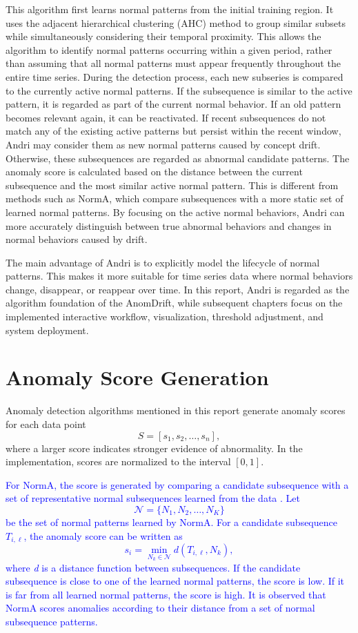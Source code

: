 This algorithm first learns normal patterns from the initial training region. It uses the adjacent hierarchical clustering (AHC) method to group similar subsets while simultaneously considering their temporal proximity. This allows the algorithm to identify normal patterns occurring within a given period, rather than assuming that all normal patterns must appear frequently throughout the entire time series. During the detection process, each new subseries is compared to the currently active normal patterns. If the subsequence is similar to the active pattern, it is regarded as part of the current normal behavior. If an old pattern becomes relevant again, it can be reactivated. If recent subsequences do not match any of the existing active patterns but persist within the recent window, Andri may consider them as new normal patterns caused by concept drift. Otherwise, these subsequences are regarded as abnormal candidate patterns. The anomaly score is calculated based on the distance between the current subsequence and the most similar active normal pattern. This is different from methods such as NormA, which compare subsequences with a more static set of learned normal patterns. By focusing on the active normal behaviors, Andri can more accurately distinguish between true abnormal behaviors and changes in normal behaviors caused by drift.

The main advantage of Andri is to explicitly model the lifecycle of normal patterns. This makes it more suitable for time series data where normal behaviors change, disappear, or reappear over time. In this report, Andri is regarded as the algorithm foundation of the AnomDrift,   while subsequent chapters focus on the implemented interactive workflow, visualization, threshold adjustment, and system deployment.

\section{Anomaly Score Generation}
\label{sec:ASG}

Anomaly detection algorithms mentioned in this report generate anomaly scores for each data point
\[S=[s_1,s_2,\ldots,s_n],\]
where a larger score indicates stronger evidence of abnormality. In the implementation, scores are normalized to the interval \([0,1]\).

\textcolor{blue}{For NormA, the score is generated by comparing a candidate subsequence with a set of representative normal subsequences learned from the data \citep{boniol2021norma}. Let \[\mathcal{N}=\{N_1,N_2,\ldots,N_K\}\] be the set of normal patterns learned by NormA. For a candidate subsequence \(T_{i,\ell}\), the anomaly score can be written as
\[s_i=\min_{N_k\in\mathcal{N}} d(T_{i,\ell},N_k),\]
where \textit{d} is a distance function between subsequences. If the candidate subsequence is close to one of the learned normal patterns, the score is low. If it is far from all learned normal patterns, the score is high. It is observed that NormA scores anomalies according to their distance from a set of normal subsequence patterns.}

